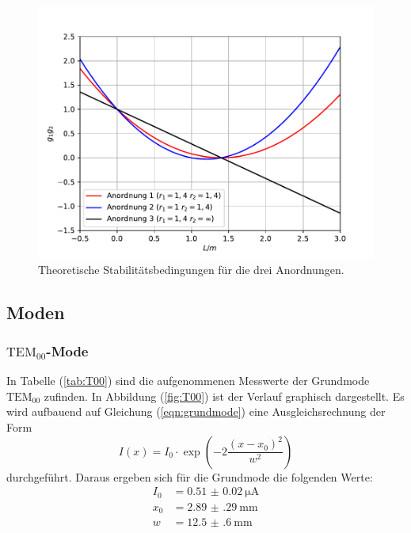 \begin{figure}
  \centering
  \includegraphics[scale=0.7]{fig/plot1.pdf}
  \caption{Theoretische Stabilitätsbedingungen für die drei Anordnungen.}
  \label{fig:plot1}
\end{figure}
\FloatBarrier
\subsection{Moden}
\label{sec:tem}
\subsubsection{$\mathrm{TEM}_\mathrm{00}$-Mode}
In Tabelle (\ref{tab:T00}) sind die aufgenommenen Messwerte der Grundmode $\mathrm{TEM}_\mathrm{00}$ zufinden. In Abbildung (\ref{fig:T00}) ist der Verlauf graphisch dargestellt.
Es wird aufbauend auf Gleichung (\ref{eqn:grundmode}) eine Ausgleichsrechnung der Form
\begin{equation}
  I(x) = I_\mathrm{0} \cdot \exp\left(-2\frac{(x-x_\mathrm{0})^2}{w^2}\right)
\end{equation}
durchgeführt.
Daraus ergeben sich für die Grundmode die folgenden Werte:
\begin{align*}
I_\mathrm{0} &= \SI{0.51(2)}{\micro\ampere}\\
x_\mathrm{0} &= \SI{2.89(29)}{\milli\meter}\\
w &= \SI{12.5(6)}{\milli\meter}
\end{align*}

